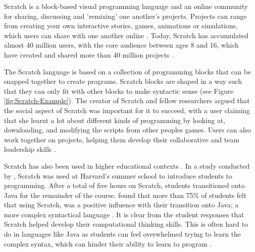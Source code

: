 \documentclass[a4paper,11.5pt]{report}
\numberwithin{figure}{section}
\numberwithin{table}{section}
\numberwithin{equation}{section}
\numberwithin{equation}{section}
\begin{document}
Scratch is a block-based visual programming language and an online community for sharing, discussing and 'remixing' one another's projects. Projects can range from creating your own interactive stories, games, animations or simulations, which users can share with one another online \citep{resnick2009}. Today, Scratch has accumulated almost 40 million users, with the core audience between ages 8 and 16, which have created and shared more than 40 million projects \citep{scratchstats}.

The Scratch language is based on a collection of programming blocks that can be snapped together to create programs. Scratch blocks are shaped in a way such that they can only fit with other blocks  to make syntactic sense (see Figure \ref{fig:Scratch-Example}). The creator of Scratch and fellow researchers argued that the social aspect of Scratch was important for it to succeed, with a user claiming that she learnt a lot about different kinds of programming by looking at, downloading, and modifying the scripts from other peoples games. Users can also work together on projects, helping them develop their collaborative and team leadership skills \citep{resnick2009}.



Scratch has also been used in higher educational contexts \citep{resnick2009}. In a study conducted by \citet{malan2007}, Scratch was used at Harvard's summer school to introduce students to programming. After a total of five hours on Scratch, students transitioned onto Java for the remainder of the course. \citeauthor{malan2007} found that more than 75\% of students felt that using Scratch, was a positive influence with their transition onto Java; a more complex syntactical language \citep{malan2007}. It is clear from the student responses that Scratch helped develop their computational thinking skills. This is often hard to do in languages like Java as students can feel overwhelmed trying to learn the complex syntax, which can hinder their ability to learn to program \citep{Koulouri2014}.

\end{document}
